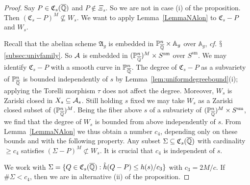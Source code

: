 \begin{proof}
Say $P\in \mathfrak{C}_s({\overline{\mathbb{Q}}})$ and $P\not\in \Xi_s$.
So we are not in case (i) of the proposition.
Then $(\mathfrak{C}_s-P)^M
\not\subseteq W_s$. We want to apply Lemma~\ref{LemmaNAlon} to
$\mathfrak{C}_s-P$ and $W_s$.

Recall that the abelian scheme $\mathfrak{A}_{g}$ is embedded in
${\mathbb{P}}_{{\overline{\mathbb{Q}}}}^n\times \mathbb{A}_g$  over
$\mathbb{A}_g$, \textit{cf.}
$\mathsection$\ref{subsec:univfamily}.
So $\mathcal{A}$ is embedded in $({\mathbb{P}}_{{\overline{\mathbb{Q}}}}^n)^M\times S^{\mathrm{sm}}$ over $S^{\mathrm{sm}}$. 
We may identify $\mathfrak{C}_s-P$ with
 a smooth curve in ${\mathbb{P}}_{{\overline{\mathbb{Q}}}}^n$. 
The degree of $\mathfrak{C}_s-P$ as a subvariety of ${\mathbb{P}}_{\overline{\mathbb{Q}}}^n$ 
is bounded independently of $s$ by
Lemma~\ref{lem:uniformdegreebound}(i); applying the Torelli
morphism $\tau$ does not affect the degree. 
Moreover, $W_s$ is Zariski closed in
$X_s\subseteq \mathcal{A}_{s}$. Still holding $s$ fixed we may take $W_s$ as a Zariski
closed subset of $({\mathbb{P}}_{{\overline{\mathbb{Q}}}}^n)^M$. Being the fiber above $s$ of a
subvariety of $({\mathbb{P}}_{{\overline{\mathbb{Q}}}}^n)^M\times S^{\mathrm{sm}}$, we find that the degree
of $W_s$ is bounded from above independently of $s$. 
From
Lemma~\ref{LemmaNAlon} we
thus obtain a number $c_4$, depending only  on these bounds and with the
following property. Any subset $\Sigma \subseteq
\mathfrak{C}_s({\overline{\mathbb{Q}}})$ with cardinality $\ge c_4$ satisfies $(\Sigma-P)^M
\not\subset W_s$. 
It is crucial that $c_4$ is independent of $s$.

We work with $\Sigma = \{Q \in \mathfrak{C}_s({\overline{\mathbb{Q}}}) : \hat{h}(Q-P)
\le  h(s)/c_3 \}$ with $c_3 = 2M/c$. 
If $\#\Sigma < c_4$, then we are in alternative (ii) of the proposition. 


\end{proof}
